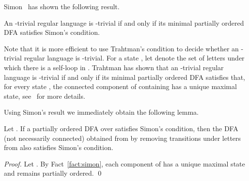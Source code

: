 \documentclass[runningheads]{llncs}
\newcommand{\R}{}
\newcommand{\J}{}
\begin{document}
  Simon~\cite{Simon1975} has shown the following result.
  \begin{fact}\label{st}\label{fact:simon}
    An \R-trivial regular language is \J-trivial if and only if its minimal partially ordered DFA satisfies Simon's condition.
  \end{fact}

  Note that it is more efficient to use Trahtman's condition to decide whether an \R-trivial regular language is \J-trivial. For a state , let  denote the set of letters under which there is a self-loop in . Trahtman has shown that an \R-trivial regular language is \J-trivial if and only if its minimal partially ordered DFA satisfies that, for every state , the connected component of  containing  has a unique maximal state, see~\cite{Trahtman2001} for more details.
  
  Using Simon's result we immediately obtain the following lemma.
  \begin{lemma}\label{lem:removing}
    Let  .
    If a partially ordered DFA  over  satisfies Simon's condition, 
    then the DFA  (not necessarily connected) obtained from 
    by removing transitions under letters from 
    also satisfies Simon's condition.
  \end{lemma}
  \begin{proof}
    Let .
    By Fact~\ref{fact:simon}, each component of  has a unique maximal state and remains partially ordered.
    \qed
  \end{proof}
\end{document}
